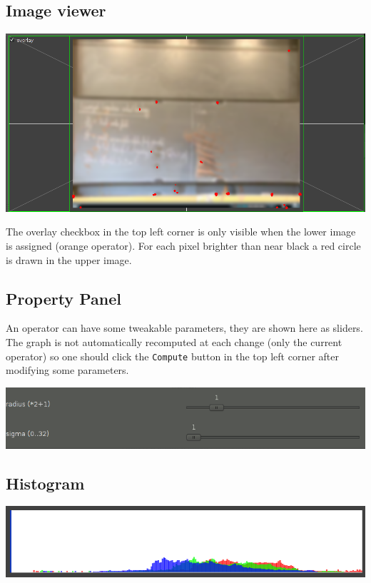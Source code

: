 \documentclass{article}
\begin{document}
\subsection{Image viewer}

\begin{center}
\includegraphics[width=\textwidth]{imageview.png}
\end{center}

The overlay checkbox in the top left corner is only visible when the lower
image is assigned (orange operator). For each pixel brighter than near black
a red circle is drawn in the upper image.

\subsection{Property Panel}

An operator can have some tweakable parameters, they are shown here as sliders.
The graph is not automatically recomputed at each change (only the current
operator) so one should click the \texttt{Compute} button in the top left
corner after modifying some parameters.

\begin{center}
\includegraphics[width=\textwidth]{parameters.png}
\end{center}

\subsection{Histogram}
\begin{center}
\includegraphics[width=\textwidth]{histogram.png}
\end{center}
\end{document}
